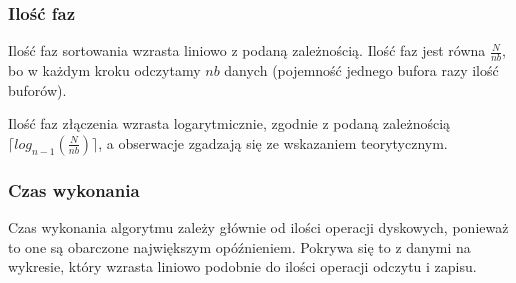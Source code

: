 \documentclass{article}
\begin{document}
\subsubsection{Ilość faz}
Ilość faz sortowania wzrasta liniowo z podaną zależnością. Ilość faz jest równa \( \frac{N}{nb} \), bo w każdym kroku odczytamy \(nb\) danych (pojemność jednego bufora razy ilość buforów).

Ilość faz złączenia wzrasta logarytmicznie, zgodnie z podaną zależnością \( \lceil log_{n-1}(\frac{N}{nb}) \rceil \), a obserwacje zgadzają się ze wskazaniem teorytycznym.

\subsubsection{Czas wykonania}
Czas wykonania algorytmu zależy głównie od ilości operacji dyskowych, ponieważ to one są obarczone największym opóźnieniem. Pokrywa się to z danymi na wykresie, który wzrasta liniowo podobnie do ilości operacji odczytu i zapisu.
\end{document}
